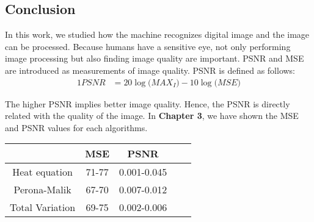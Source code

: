 \documentclass[12pt]{report}
\begin{document}
\begin{tableofcontents}
		\chapter{Conclusion}
In this work, we studied how the machine recognizes digital image and the image can be processed. Because humans have a sensitive eye, not only performing image processing but also finding image quality are important. PSNR and MSE are introduced as measurements of image quality. PSNR is defined as follows:
			\begin{alignat*}{1}
\displaystyle PSNR &= 20\log\big({MAX_{I}}\big) - 10\log\big(MSE\big)
	        \end{alignat*}
\par
The higher PSNR implies better image quality. Hence, the PSNR is directly related with the quality of the image. In \textbf{Chapter 3}, we have shown the MSE and PSNR values for each algorithms.
\begin{center}
\begin{tabular}{@{}lllll@{}}
\toprule
\multicolumn{1}{c}{} 	& \multicolumn{1}{c}{MSE} & \multicolumn{1}{c}{PSNR} &  &  \\ \midrule
\multicolumn{1}{c}{Heat equation}   & \multicolumn{1}{c}{71-77} & \multicolumn{1}{c}{0.001-0.045} &  &  \\
\multicolumn{1}{c}{Perona-Malik}    & \multicolumn{1}{c}{67-70} & \multicolumn{1}{c}{0.007-0.012} &  &  \\
\multicolumn{1}{c}{Total Variation} & \multicolumn{1}{c}{69-75} & \multicolumn{1}{c}{0.002-0.006} &  &  \\ \bottomrule
\end{tabular}
\end{center}
\par

\end{tableofcontents}
\end{document}
